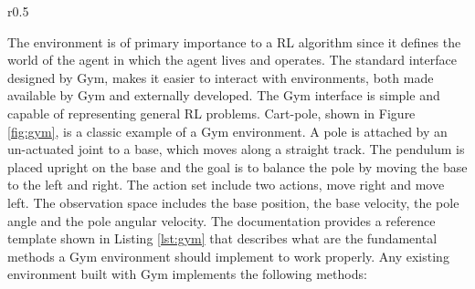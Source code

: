 \begin{wrapfigure}{r}{0.5\textwidth}
  \begin{center}
  \end{center}
  \caption{Cart-pole in Gym}
  \label{fig:gym}
\end{wrapfigure}
The environment is of primary importance to a RL algorithm since it defines the world of the agent in which the agent lives and operates. The standard interface designed by Gym, makes it easier to interact with environments, both made available by Gym and externally developed.
The Gym interface is simple and capable of representing general RL problems. Cart-pole, shown in Figure \ref{fig:gym}, is a classic example of a Gym environment. A pole is attached by an un-actuated joint to a base, which moves along a straight track. The pendulum is placed upright on the base and the goal is to balance the pole by moving the base to the left and right. The action set include two actions, move right and move left. The observation space includes the base position, the base velocity, the pole angle and the pole angular velocity.
The documentation provides a reference template shown in Listing \ref{lst:gym} that describes what are the fundamental methods a Gym environment should implement to work properly.
Any existing environment built with Gym implements the following methods:

\begin{center}
  \begin{minipage}{0.45\linewidth}
    
    \end{minipage}
\end{center}

